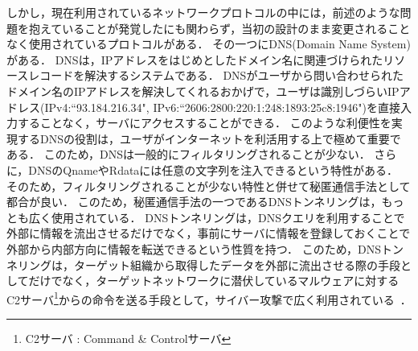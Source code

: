 しかし，現在利用されているネットワークプロトコルの中には，前述のような問題を抱えていることが発覚したにも関わらず，当初の設計のまま変更されることなく使用されているプロトコルがある．
その一つにDNS(Domain Name System)がある．
DNSは，IPアドレスをはじめとしたドメイン名に関連づけられたリソースレコードを解決するシステムである．
DNSがユーザから問い合わせられたドメイン名のIPアドレスを解決してくれるおかげで，ユーザは識別しづらいIPアドレス(IPv4:``93.184.216.34", IPv6:``2606:2800:220:1:248:1893:25c8:1946")を直接入力することなく，サーバにアクセスすることができる．
このような利便性を実現するDNSの役割は，ユーザがインターネットを利活用する上で極めて重要である．
このため，DNSは一般的にフィルタリングされることが少ない．
さらに，DNSのQnameやRdataには任意の文字列を注入できるという特性がある．
そのため，フィルタリングされることが少ない特性と併せて秘匿通信手法として都合が良い．
このため，秘匿通信手法の一つであるDNSトンネリングは，もっとも広く使用されている．
DNSトンネリングは，DNSクエリを利用することで外部に情報を流出させるだけでなく，事前にサーバに情報を登録しておくことで外部から内部方向に情報を転送できるという性質を持つ．
このため，DNSトンネリングは，ターゲット組織から取得したデータを外部に流出させる際の手段としてだけでなく，ターゲットネットワークに潜伏しているマルウェアに対するC2サーバ\footnote{C2サーバ : Command \& Controlサーバ}からの命令を送る手段として，サイバー攻撃で広く利用されている~\cite{frameworkpos, bondupdater, bernhardpos, multigrainpos, pisloader, denis, dnsmessenger, udpos}．

